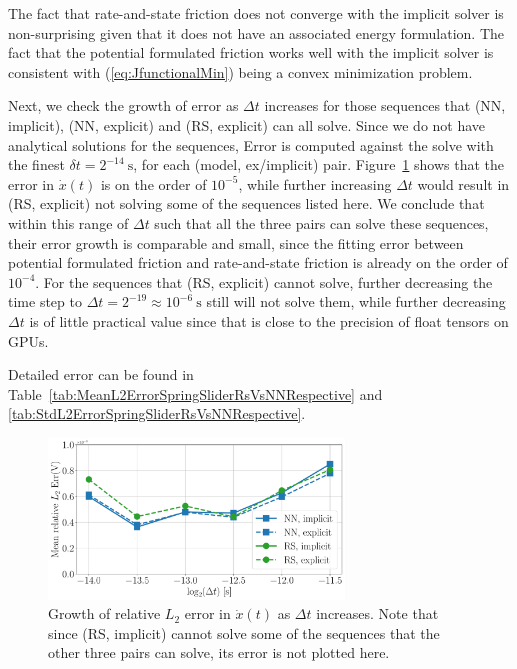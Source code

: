 The fact that rate-and-state friction does not converge with the implicit solver is non-surprising given that it does not have an associated energy formulation. 
The fact that the potential formulated friction works well with the implicit solver is consistent with (\ref{eq:JfunctionalMin}) being a convex minimization problem. 

Next, 
we check the growth of error as $\Delta t$ increases for those sequences that (NN, implicit), (NN, explicit) and (RS, explicit) can all solve. 
Since we do not have analytical solutions for the sequences, 
Error is computed against the solve with the finest $\delta t = 2^{-14}\ \mathrm{s}$, for each (model, ex/implicit) pair. 
Figure~\ref{fig:ErrGrowthDt} shows that the error in $\dot{x}(t)$ is on the order of $10^{-5}$, 
while further increasing $\Delta t$ would result in (RS, explicit) not solving some of the sequences listed here. 
We conclude that within this range of $\Delta t$ such that all the three pairs can solve these sequences, 
their error growth is comparable and small, 
since the fitting error between potential formulated friction and rate-and-state friction is already on the order of $10^{-4}$. 
For the sequences that (RS, explicit) cannot solve, 
further decreasing the time step to $\Delta t = 2^{-19}\approx 10^{-6}\ \mathrm{s}$ still will not solve them, 
while further decreasing $\Delta t$ is of little practical value since that is close to the precision of float tensors on GPUs. 

Detailed error can be found in Table~\ref{tab:MeanL2ErrorSpringSliderRsVsNNRespective} and \ref{tab:StdL2ErrorSpringSliderRsVsNNRespective}.
\begin{figure}
    \centering
    \includegraphics[width=0.7\textwidth]{figures/ErrGrowthDeltaT.pdf}
    \caption{Growth of relative $L_2$ error in $\dot{x}(t)$ as $\Delta t$ increases. 
    Note that since (RS, implicit) cannot solve some of the sequences that the other three pairs can solve, 
    its error is not plotted here.}
    \label{fig:ErrGrowthDt}
\end{figure}

